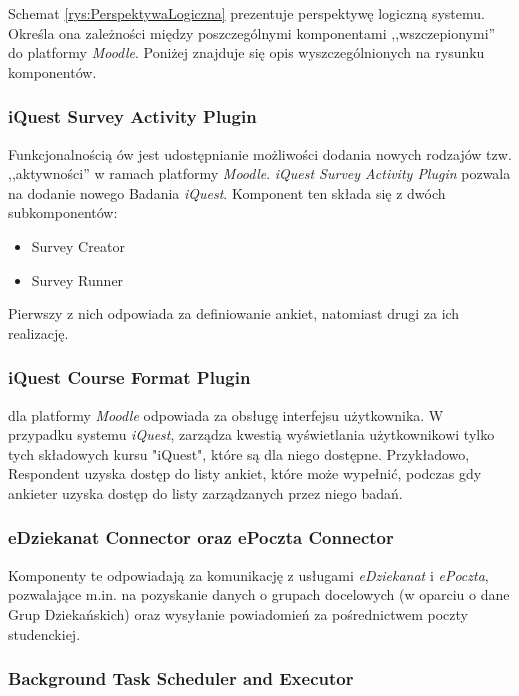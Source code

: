 Schemat \ref{rys:PerspektywaLogiczna} prezentuje perspektywę logiczną systemu. Określa ona zależności między poszczególnymi komponentami ,,wszczepionymi'' do platformy \textit{Moodle}. Poniżej znajduje się opis wyszczególnionych na rysunku komponentów.

\subsubsection{iQuest Survey Activity Plugin}
\label{Chapter5421}
Funkcjonalnością ów jest udostępnianie możliwości dodania nowych rodzajów tzw. ,,aktywności'' w ramach platformy \textit{Moodle}. \textit{iQuest Survey Activity Plugin} pozwala na dodanie nowego Badania \textit{iQuest}. Komponent ten składa się z dwóch subkomponentów:
\begin{itemize}
\item{Survey Creator}
\item{Survey Runner}
\end{itemize}
Pierwszy z nich odpowiada za definiowanie ankiet, natomiast drugi za ich realizację.

\subsubsection{iQuest Course Format Plugin}
\label{Chapter5422}

 dla platformy \textit{Moodle} odpowiada za obsługę interfejsu użytkownika. W przypadku systemu \textit{iQuest}, zarządza kwestią wyświetlania użytkownikowi tylko tych składowych kursu "iQuest", które są dla niego dostępne. Przykładowo, Respondent uzyska dostęp do listy ankiet, które może wypełnić, podczas gdy ankieter uzyska dostęp do listy zarządzanych przez niego badań.

\subsubsection{eDziekanat Connector oraz ePoczta Connector}
\label{Chapter5423}

Komponenty te odpowiadają za komunikację z usługami \textit{eDziekanat} i \textit{ePoczta}, pozwalające m.in. na pozyskanie danych o grupach docelowych (w oparciu o dane Grup Dziekańskich) oraz wysyłanie powiadomień za pośrednictwem poczty studenckiej.

\subsubsection{Background Task Scheduler and Executor}
\label{Chapter5424}

